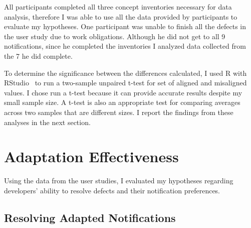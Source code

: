 All participants completed all three concept inventories necessary for data analysis, therefore I was able to use all the data provided by participants to evaluate my hypotheses.
One participant was unable to finish all the defects in the user study due to work obligations. Although he did not get to all 9 notifications, since he completed the inventories I analyzed data collected from the 7 he did complete.

To determine the significance between the differences calculated, I used R with RStudio~\cite{RSoftware} to run a two-sample unpaired t-test for set of aligned and misaligned values. I chose run a t-test because it can provide accurate results despite my small sample size. A t-test is also an  appropriate test for comparing averages across two samples that are different sizes.
I report the findings from these analyses in the next section.

\section{Adaptation Effectiveness}
Using the data from the user studies, I evaluated my hypotheses regarding developers' ability to resolve defects and their notification preferences.

\subsection{Resolving Adapted Notifications}



